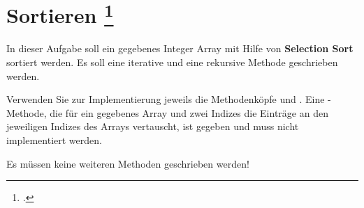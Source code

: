 \documentclass{lehramt-informatik-aufgabe}
\begin{document}

\section{Sortieren
\footcite[Aufgabe 2]{aud:e-klausur}}

In dieser Aufgabe soll ein gegebenes Integer Array mit Hilfe von
\textbf{Selection Sort} sortiert werden. Es soll eine
iterative und eine
rekursive Methode geschrieben werden.

Verwenden Sie zur Implementierung jeweils die Methodenköpfe
 und . Eine
-Methode, die für ein gegebenes Array und zwei Indizes die
Einträge an den jeweiligen Indizes des Arrays vertauscht, ist gegeben
und muss nicht implementiert werden.

Es müssen keine weiteren Methoden geschrieben werden!

\begin{liAntwort}



\end{liAntwort}
\end{document}

